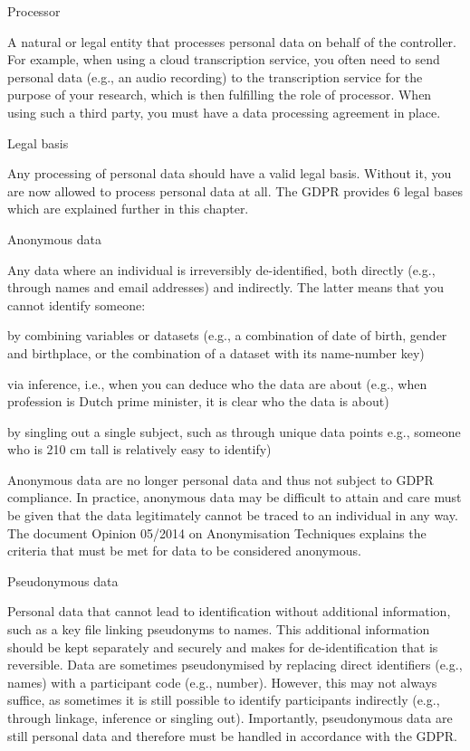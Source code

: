 \documentclass[
]{book}
\begin{document}
Processor

A natural or legal entity that processes personal data on behalf of the
controller. For example, when using a cloud transcription service, you often
need to send personal data (e.g., an audio recording) to the transcription
service for the purpose of your research, which is then fulfilling the role
of processor. When using such a third party, you must have a
data processing agreement in place.

Legal basis

Any processing of personal data should have a valid legal basis. Without it,
you are now allowed to process personal data at all. The GDPR provides 6 legal
bases which are explained further in this chapter.

Anonymous data

Any data where an individual is irreversibly de-identified, both directly
(e.g., through names and email addresses) and indirectly. The latter means
that you cannot identify someone:

by combining variables or datasets (e.g., a combination of date of birth,
gender and birthplace, or the combination of a dataset with its name-number key)

via inference, i.e., when you can deduce who the data are about (e.g.,
when profession is Dutch prime minister, it is clear who the data is about)

by singling out a single subject, such as through unique data points
e.g., someone who is 210 cm tall is relatively easy to identify)

Anonymous data are no longer personal data and thus not subject to GDPR
compliance. In practice, anonymous data may be difficult to attain and care
must be given that the data legitimately cannot be traced to an individual in
any way. The document
Opinion 05/2014 on Anonymisation Techniques
explains the criteria that must be met for data to be considered anonymous.

Pseudonymous data

Personal data that cannot lead to identification without additional
information, such as a key file linking pseudonyms to names. This additional
information should be kept separately and securely and makes for
de-identification that is reversible. Data are sometimes pseudonymised by
replacing direct identifiers (e.g., names) with a participant code (e.g.,
number). However, this may not always suffice, as sometimes it is still
possible to identify participants indirectly (e.g., through linkage, inference
or singling out). Importantly, pseudonymous data are still personal data and
therefore must be handled in accordance with the GDPR.
\end{document}
